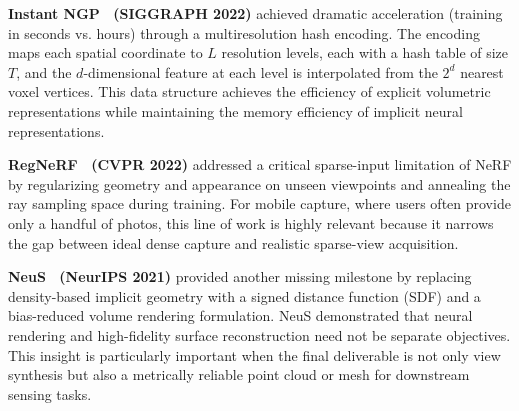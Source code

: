 \documentclass[journal]{IEEEtran}
\begin{document}
\textbf{Instant NGP~\cite{instantngp} (SIGGRAPH 2022)} achieved dramatic acceleration (training in seconds vs. hours) through a multiresolution hash encoding. The encoding maps each spatial coordinate to $L$ resolution levels, each with a hash table of size $T$, and the $d$-dimensional feature at each level is interpolated from the $2^d$ nearest voxel vertices. This data structure achieves the efficiency of explicit volumetric representations while maintaining the memory efficiency of implicit neural representations.

\textbf{RegNeRF~\cite{regnerf} (CVPR 2022)} addressed a critical sparse-input limitation of NeRF by regularizing geometry and appearance on unseen viewpoints and annealing the ray sampling space during training. For mobile capture, where users often provide only a handful of photos, this line of work is highly relevant because it narrows the gap between ideal dense capture and realistic sparse-view acquisition.

\textbf{NeuS~\cite{neus} (NeurIPS 2021)} provided another missing milestone by replacing density-based implicit geometry with a signed distance function (SDF) and a bias-reduced volume rendering formulation. NeuS demonstrated that neural rendering and high-fidelity surface reconstruction need not be separate objectives. This insight is particularly important when the final deliverable is not only view synthesis but also a metrically reliable point cloud or mesh for downstream sensing tasks.

\begin{table}[t]
\caption{Comparative analysis of NeRF-era methods from a signal perception perspective.}
\label{tab:nerf_compare}
\centering
\scriptsize
\setlength{\tabcolsep}{2pt}
\end{table}
\end{document}
